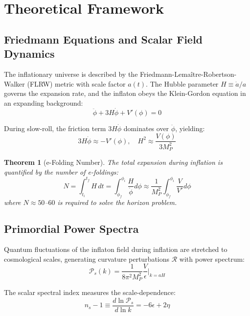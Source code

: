 \documentclass[a4paper, 11pt]{article}
\newtheorem{theorem}{Theorem}[section]
\begin{document}
\section{Theoretical Framework}

\subsection{Friedmann Equations and Scalar Field Dynamics}

The inflationary universe is described by the Friedmann-Lemaître-Robertson-Walker (FLRW) metric
with scale factor $a(t)$. The Hubble parameter $H \equiv \dot{a}/a$ governs the expansion rate,
and the inflaton obeys the Klein-Gordon equation in an expanding background:
\begin{equation}
\ddot{\phi} + 3H\dot{\phi} + V'(\phi) = 0
\end{equation}

During slow-roll, the friction term $3H\dot{\phi}$ dominates over $\ddot{\phi}$, yielding:
\begin{equation}
3H\dot{\phi} \approx -V'(\phi), \quad H^2 \approx \frac{V(\phi)}{3M_P^2}
\end{equation}

\begin{theorem}[e-Folding Number]
The total expansion during inflation is quantified by the number of e-foldings:
\begin{equation}
N = \int_{t_i}^{t_f} H \, dt = \int_{\phi_f}^{\phi_i} \frac{H}{\dot{\phi}} d\phi
\approx \frac{1}{M_P^2} \int_{\phi_f}^{\phi_i} \frac{V}{V'} d\phi
\end{equation}
where $N \approx 50$--$60$ is required to solve the horizon problem.
\end{theorem}

\subsection{Primordial Power Spectra}

Quantum fluctuations of the inflaton field during inflation are stretched to cosmological scales,
generating curvature perturbations $\mathcal{R}$ with power spectrum:
\begin{equation}
\mathcal{P}_s(k) = \frac{1}{8\pi^2 M_P^2} \frac{V}{\epsilon} \bigg|_{k=aH}
\end{equation}

The scalar spectral index measures the scale-dependence:
\begin{equation}
n_s - 1 \equiv \frac{d \ln \mathcal{P}_s}{d \ln k} = -6\epsilon + 2\eta
\end{equation}
\end{document}
